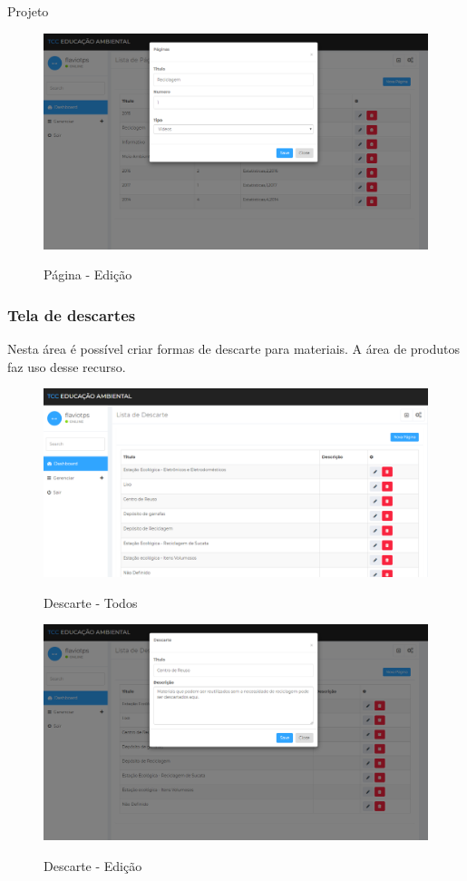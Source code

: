 \documentclass[
	12pt,				%
	openright,			%
	twoside,			%
	a4paper,			%
	english,			%
	french,				%
	spanish,			%
	brazil				%
	]{abntex2}
\begin{document}
\begin{chapter}{Projeto}
\begin{figure}[h]
\centering
   \caption{Página - Edição}
   \includegraphics[scale=0.40]{media/tela_pagina_site_2.png}
     \label{fig:tela_pagina_site_2}
\end{figure}
\newpage
\subsubsection{Tela de descartes} \label{tela_descarte}
Nesta área é possível criar formas de descarte para materiais. A área de produtos faz uso desse recurso.

\begin{figure}[h]
\centering
   \caption{Descarte - Todos}
   \includegraphics[scale=0.40]{media/tela_descarte_site_1.png}
     \label{fig:tela_descarte_site_1}
\end{figure}

\begin{figure}[h]
\centering
   \caption{Descarte - Edição}
   \includegraphics[scale=0.40]{media/tela_descarte_site_2.png}
     \label{fig:tela_descarte_site_2}
\end{figure}
\newpage

\end{chapter}
\end{document}
